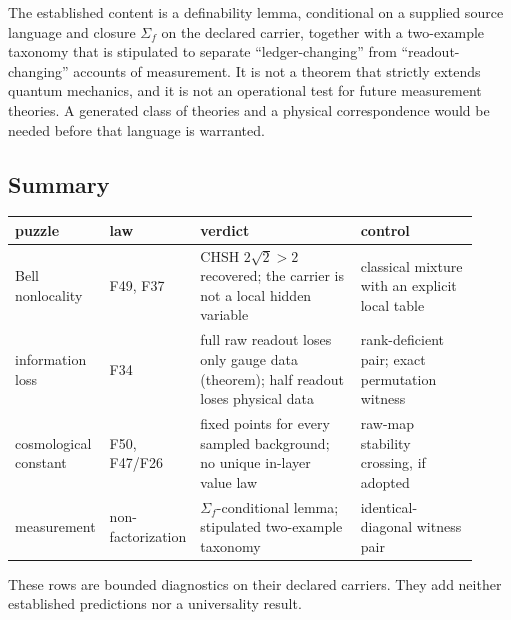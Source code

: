 The established content is a definability lemma, conditional on a supplied source language and closure
\(\Sigma_f\) on the declared carrier, together with a two-example taxonomy that is stipulated to separate
``ledger-changing'' from ``readout-changing'' accounts of measurement. It is not a theorem that strictly extends
quantum mechanics, and it is not an operational test for future measurement theories. A generated class of theories
and a physical correspondence would be needed before that language is warranted.

\subsection{Summary}\label{the-pattern}

\begin{center}
\small
\begin{longtable}[]{@{}p{0.17\linewidth}p{0.13\linewidth}p{0.36\linewidth}p{0.26\linewidth}@{}}
\toprule
puzzle & law & verdict & control\\
\midrule
\endhead
Bell nonlocality & F49, F37 & CHSH \(2\sqrt2>2\) recovered; the carrier is not a local hidden variable & classical
mixture with an explicit local table\\
information loss & F34 & full raw readout loses only gauge data (theorem); half readout loses physical data &
rank-deficient pair; exact permutation witness\\
cosmological constant & F50, F47/F26 & fixed points for every sampled background; no unique in-layer value law &
raw-map stability crossing, if adopted\\
measurement & non-factorization & \(\Sigma_f\)-conditional lemma; stipulated two-example taxonomy & identical-diagonal
witness pair\\
\bottomrule
\end{longtable}
\end{center}

These rows are bounded diagnostics on their declared carriers. They add neither established predictions nor a
universality result.
